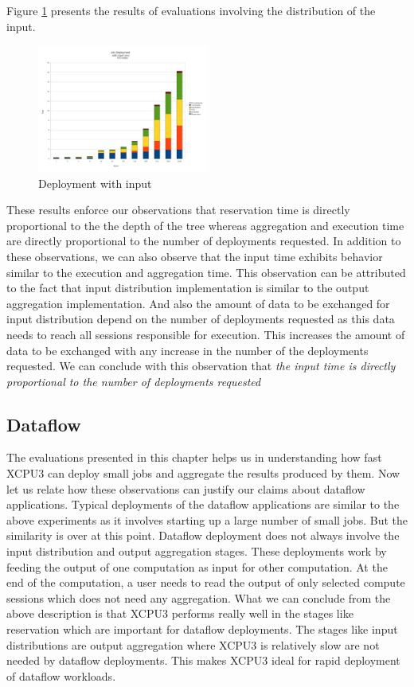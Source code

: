 Figure \ref{fig:wc_graph} presents the results of evaluations involving the
distribution of the input.


\begin{figure}[h]
  \begin{center}
    \leavevmode
      \includegraphics[height=0.2\textheight,width=0.5\textwidth]
		{./img/wc_graph}
    \caption{Deployment with input}
    \label{fig:wc_graph}
  \end{center}
\end{figure}

These results enforce our observations that reservation time is directly
proportional to the the depth of the tree whereas aggregation and execution time
are directly proportional to the number of deployments requested.  In addition
to these observations, we can also observe that the input time exhibits 
behavior similar to the execution and aggregation time.  This observation can be
attributed to the fact that input distribution implementation is similar
to the output aggregation implementation.  And also the amount of data to be
exchanged for input distribution depend on the number of deployments requested
as this data needs to reach all sessions responsible for execution.  This
increases the amount of data to be exchanged with any increase in the number of
the deployments requested.  We can conclude with this observation that
\textit{the input time is directly proportional to the number of deployments
requested}

\subsection{Dataflow}
The evaluations presented in this chapter helps us in understanding how fast
XCPU3 can deploy small jobs and aggregate the results produced by them.  Now
let us relate how these observations can justify our claims about dataflow
applications. Typical deployments of the dataflow applications are similar to
the above experiments as it involves starting up a large number of small jobs.
But the similarity is over at this point. Dataflow deployment does not always
involve the input distribution and output aggregation stages.  These deployments
work by feeding the output of one computation as input for other computation. 
At the end of the computation, a user needs to read the output of only selected
compute sessions which does not need any aggregation.  What we can conclude from
the above description is that XCPU3 performs really well in the stages like
reservation which are important for dataflow deployments.  The stages like input
distributions are output aggregation where XCPU3 is relatively slow are not
needed by dataflow deployments.  This makes XCPU3 ideal for rapid deployment of
dataflow workloads.

